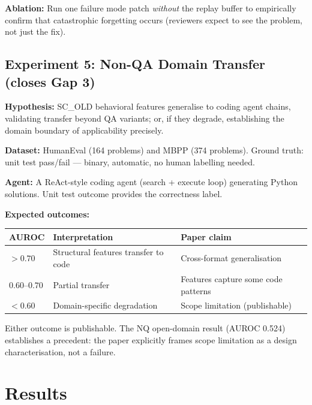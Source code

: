 \documentclass[11pt,a4paper]{article}
\begin{document}
\textbf{Ablation:} Run one failure mode patch \emph{without} the replay buffer
to empirically confirm that catastrophic forgetting occurs (reviewers expect
to see the problem, not just the fix).

\subsection{Experiment 5: Non-QA Domain Transfer (closes Gap 3)}

\textbf{Hypothesis:} SC\_OLD behavioral features generalise to coding agent
chains, validating transfer beyond QA variants; or, if they degrade,
establishing the domain boundary of applicability precisely.

\textbf{Dataset:} HumanEval \cite{chen2021humaneval} (164 problems) and
MBPP \cite{austin2021mbpp} (374 problems). Ground truth: unit test pass/fail
--- binary, automatic, no human labelling needed.

\textbf{Agent:} A ReAct-style coding agent (search + execute loop) generating
Python solutions. Unit test outcome provides the correctness label.

\textbf{Expected outcomes:}

\begin{center}
\begin{tabular}{lll}
\toprule
\textbf{AUROC} & \textbf{Interpretation} & \textbf{Paper claim} \\
\midrule
$> 0.70$ & Structural features transfer to code & Cross-format generalisation \\
$0.60$--$0.70$ & Partial transfer & Features capture some code patterns \\
$< 0.60$ & Domain-specific degradation & Scope limitation (publishable) \\
\bottomrule
\end{tabular}
\end{center}

Either outcome is publishable. The NQ open-domain result (AUROC 0.524)
establishes a precedent: the paper explicitly frames scope limitation
as a design characterisation, not a failure.

\section{Results}
\label{sec:results}
\end{document}
